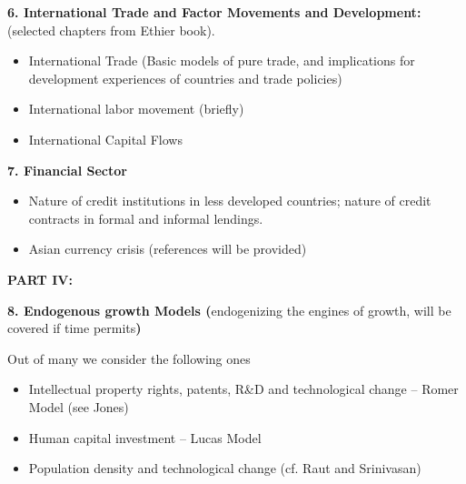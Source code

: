 \documentclass[11pt,pdftex]{article}
\begin{document}
\begin{description}
\item  \textbf{6. International Trade and Factor Movements and Development:}
(selected chapters from Ethier book).

\begin{itemize}
\item  International Trade (Basic models of pure trade, and implications for
development experiences of countries and trade policies)

\item  International labor movement (briefly)

\item  International Capital Flows
\end{itemize}

\item  \textbf{7. Financial Sector}

\begin{itemize}
\item  Nature of credit institutions in less developed countries; nature of
credit contracts in formal and informal lendings.

\item  Asian currency crisis (references will be provided)
\end{itemize}
\end{description}

\textbf{PART IV:}

\begin{description}
\item  \textbf{8. Endogenous growth Models (}endogenizing the engines of
growth, will be covered if time permits\textbf{) }
\end{description}

Out of many we consider the following ones

\begin{itemize}
\item  Intellectual property rights, patents, R\&D and technological change
-- Romer Model (see Jones)

\item  Human capital investment -- Lucas Model

\item  Population density and technological change (cf. Raut and Srinivasan)
\end{itemize}
\end{document}
